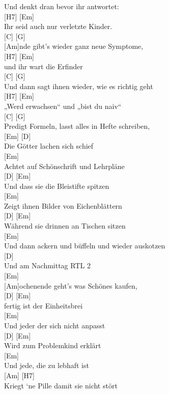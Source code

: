 \documentclass[
  letterpaper,
]{scrbook}
\begin{document}
Und denkt dran bevor ihr antwortet:\\
{[}H7{]} {[}Em{]}\\
Ihr seid auch nur verletzte Kinder.\\
{[}C{]} {[}G{]}\\
{[}Am{]}nde gibt's wieder ganz neue Symptome,\\
{[}H7{]} {[}Em{]}\\
und ihr wart die Erfinder\\
{[}C{]} {[}G{]}\\
Und dann sagt ihnen wieder, wie es richtig geht\\
{[}H7{]} {[}Em{]}\\
„Werd erwachsen`` und „bist du naiv``\\
{[}C{]} {[}G{]}\\
Predigt Formeln, lasst alles in Hefte schreiben,\\
{[}Em{]} {[}D{]}\\
Die Götter lachen sich schief\\
{[}Em{]}\\
Achtet auf Schönschrift und Lehrpläne\\
{[}D{]} {[}Em{]}\\
Und dass sie die Bleistifte spitzen\\
{[}Em{]}\\
Zeigt ihnen Bilder von Eichenblättern\\
{[}D{]} {[}Em{]}\\
Während sie drinnen an Tischen sitzen\\
{[}Em{]}\\
Und dann ackern und büffeln und wieder auskotzen\\
{[}D{]}\\
Und am Nachmittag RTL 2\\
{[}Em{]}\\
{[}Am{]}ochenende geht's was Schönes kaufen,\\
{[}D{]} {[}Em{]}\\
fertig ist der Einheitsbrei\\
{[}Em{]}\\
Und jeder der sich nicht anpasst\\
{[}D{]} {[}Em{]}\\
Wird zum Problemkind erklärt\\
{[}Em{]}\\
Und jede, die zu lebhaft ist\\
{[}Am{]} {[}H7{]}\\
Kriegt `ne Pille damit sie nicht stört
\end{document}

